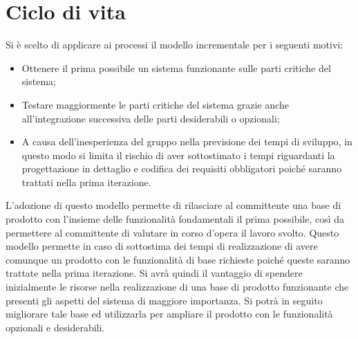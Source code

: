 \section{Ciclo di vita}{
	Si è scelto di applicare ai processi il modello incrementale per i seguenti motivi:
	\begin{itemize}
		\item Ottenere il prima possibile un sistema funzionante sulle parti critiche del sistema;
		\item Testare maggiormente le parti critiche del sistema grazie anche all'integrazione successiva delle parti desiderabili o opzionali;
		\item A causa dell'inesperienza del gruppo nella previsione dei tempi di sviluppo, in questo modo si limita il rischio di aver sottostimato i tempi riguardanti la progettazione in dettaglio e codifica dei requisiti obbligatori poiché saranno trattati nella prima iterazione.
	\end{itemize}
	L'adozione di questo modello permette di rilasciare al committente una base di prodotto con l'insieme delle funzionalità fondamentali il prima possibile, così da permettere al committente di valutare in corso d'opera il lavoro svolto. 
	Questo modello permette in caso di sottostima dei tempi di realizzazione di avere comunque un prodotto con le funzionalità di base richieste poiché queste saranno trattate nella prima iterazione.
	Si avrà quindi il vantaggio di spendere inizialmente le risorse nella realizzazione di una base di prodotto funzionante che presenti gli aspetti del sistema di maggiore importanza. 
	Si potrà in seguito migliorare tale base ed utilizzarla per ampliare il prodotto con le funzionalità opzionali e desiderabili.
}



